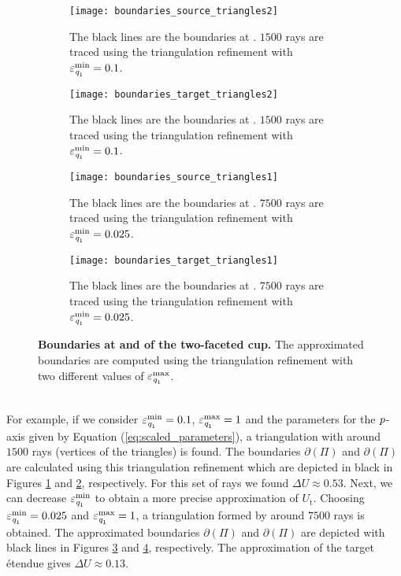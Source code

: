 \begin{figure}[h!]
\centering
\begin{subfigure}{.45\textwidth}
  \texttt{[image: boundaries\_source\_triangles2]}
 \caption{The black lines are the boundaries at . $1500$ rays are traced using the triangulation refinement with $\varepsilon_{\textit{q}_1}^{\textrm{min}}=0.1$. }
  \label{fig:boundaries_s2}
\end{subfigure}%
\hfill
\begin{subfigure}{.45\textwidth}
  \texttt{[image: boundaries\_target\_triangles2]}
  \caption{The black lines are the boundaries at . $1500$ rays are traced using the triangulation refinement with $\varepsilon_{\textit{q}_1}^{\textrm{min}}=0.1$.} %
  \label{fig:boundaries_t2}
\end{subfigure} %
\hfill
\begin{subfigure}{.45\textwidth}
  \texttt{[image: boundaries\_source\_triangles1]}
  \caption{The black lines are the boundaries at . $7500$ rays are traced using the triangulation refinement with $\varepsilon_{\textit{q}_1}^{\textrm{min}}=0.025$.}
  \label{fig:boundaries_s1}
\end{subfigure}%
\hfill
\begin{subfigure}{.45\textwidth}
  \texttt{[image: boundaries\_target\_triangles1]}
 \caption{The black lines are the boundaries at . $7500$ rays are traced using the triangulation refinement with $\varepsilon_{\textit{q}_1}^{\textrm{min}}=0.025$.} %
  \label{fig:boundaries_t1}
\end{subfigure}
\caption{\textbf{Boundaries at  and  of the two-faceted cup.} The approximated boundaries are computed using the triangulation refinement with two different values of $\varepsilon_{\textit{q}_1}^{\textrm{max}}$.}
\label{fig:boundaries_cup}
\end{figure} 
\\ \indent For example, if we consider $\varepsilon_{\textit{q}_1}^{\textrm{min}}=0.1$, $\varepsilon_{\textit{q}_1}^{\textrm{max}}=1$ and the parameters for the $\textit{p}$-axis given by Equation (\ref{eq:scaled_parameters}), a triangulation with around $1500$ rays (vertices of the triangles) is found. The boundaries $\partial$$(\Pi)$ and $\partial$$(\Pi)$ are calculated using this triangulation refinement which are depicted in black in Figures \ref{fig:boundaries_s2} and \ref{fig:boundaries_t2}, respectively. For this set of rays we found $\Delta U \approx 0.53 $. Next, we can decrease $\varepsilon_{\textit{q}_1}^{\textrm{min}}$ to obtain a more precise approximation of $U_{\textrm{t}}$. Choosing $\varepsilon_{\textit{q}_1}^{\textrm{min}} = 0.025$ and $\varepsilon_{\textit{q}_1}^{\textrm{max}}=1$, a triangulation formed by around $7500$ rays is obtained. The approximated boundaries $\partial$$(\Pi)$ and $\partial$$(\Pi)$ are depicted with black lines in Figures \ref{fig:boundaries_s1} and \ref{fig:boundaries_t1}, respectively. The approximation of the target \'{e}tendue gives $\Delta U \approx 0.13 $.
